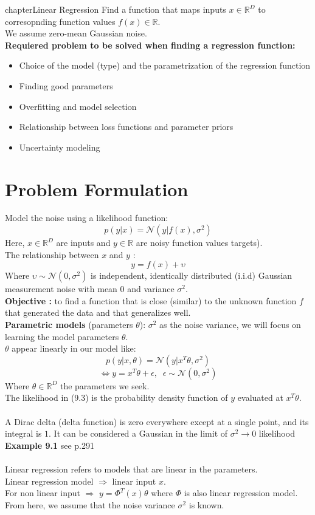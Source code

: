 chapter{Linear Regression}
Find a function that maps inputs $x \in \mathbb{R}^D$ to corresopnding function values $f(x) \in \mathbb{R}$. \\ 
We assume zero-mean Gaussian noise.\\
\textbf{Requiered problem to be solved when finding a regression function:}
\begin{itemize}
	\item Choice of the model (type) and the parametrization of the regression function
	\item Finding good parameters
	\item Overfitting and model selection
	\item Relationship between loss functions and parameter priors
	\item Uncertainty modeling
\end{itemize}

\section{Problem Formulation}
Model the noise using a likelihood function:
\[
p(y|x) = \mathcal{N}(y|f(x), \sigma^2) \tag{9.1}
\]
Here, $x \in \mathbb{R}^D$ are inputs and $y \in \mathbb{R}$ are noisy function values targets). \\
The relationship between $x$ and $y$ :
\[
y = f(x) + \upsilon \tag{9.2} 
\]
Where $\upsilon \sim \mathcal{N}(0, \sigma^2)$ is independent, identically distributed (i.i.d)  Gaussian measurement noise with mean 0 and variance $\sigma^2$.\\
\textbf{Objective :} to find a function that is close (similar) to the unknown function $f$ that generated the data and that generalizes well. \\
\textbf{Parametric models} (parameters $\theta$): $\sigma^2$ as the noise variance, we will focus on learning the model parameters $\theta$.\\
$\theta$ appear linearly in our model like:
\[
p(y|x, \theta) = \mathcal{N}(y|x^T  \theta, \sigma^2) \tag{9.3}
\]
\[
\Leftrightarrow y = x^T \theta + \epsilon, \; \; \epsilon \sim \mathcal{N} (0, \sigma^2) \tag{9.4}
\]
Where $\theta \in \mathbb{R}^D$ the parameters we seek.\\
The likelihood in (9.3) is the probability density function of $y$ evaluated at $x^{T} \theta$.\\ \\ 
A Dirac delta (delta function) is zero everywhere except at a single point, and its integral is $1$. It can be considered a Gaussian in the limit of $\sigma^2 \rightarrow 0$ likelihood
\textbf{Example 9.1} see p.291\\ \\
Linear regression refers to models that are linear in the parameters. \\
Linear regression model $\Rightarrow$ linear input $x$.\\
For non linear input $\Rightarrow$ $y = \Phi^{T}(x) \theta$ where $\Phi$ is also linear regression model.\\
From here, we assume that the noise variance $\sigma^2$ is known.

